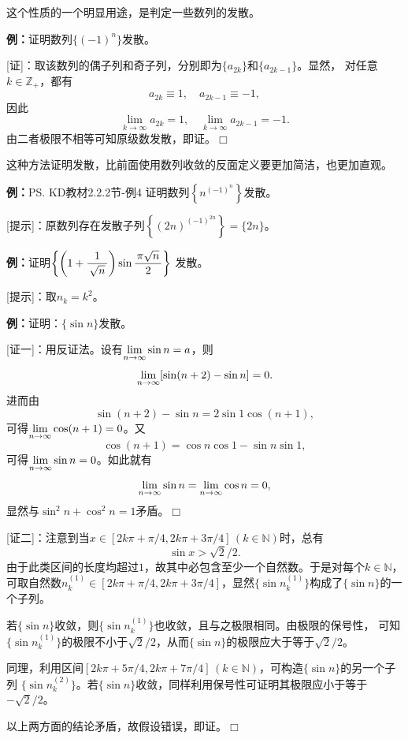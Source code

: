 
这个性质的一个明显用途，是判定一些数列的发散。

{\bf 例：}证明数列$\{(-1)^n\}$发散。

[证]：取该数列的偶子列和奇子列，分别即为$\{a_{2k}\}$和$\{a_{2k-1}\}$。显然，
对任意$k\in\mathbb{Z}_+$，都有
$$a_{2k}\equiv 1,\quad a_{2k-1}\equiv -1,$$
因此
$$\lim\limits_{k\to\infty}a_{2k}=1,\quad
\lim\limits_{k\to\infty}a_{2k-1}=-1.$$
由二者极限不相等可知原级数发散，即证。\hfill $\Box$

这种方法证明发散，比前面使用数列收敛的反面定义要更加简洁，也更加直观。

{\bf 例：}\ps{KD教材2.2.2节-例4}
证明数列$\left\{n^{(-1)^n}\right\}$发散。

[提示]：原数列存在发散子列$\left\{(2n)^{(-1)^{2n}}\right\}=\{2n\}$。

{\bf 例：}证明$\left\{\left(1+\displaystyle\frac{\,{1}\,}{\,{\sqrt n}\,}\right)\sin\displaystyle\frac{\,{\pi\sqrt n}\,}{\,{2}\,}\right\}$
发散。

[提示]：取$n_k=k^2$。 

\begin{shaded}
	{\bf 例：}证明：$\{\sin n\}$发散。
	
	[证一]：用反证法。设有$\lim\limits_{n\to\infty}\sin n=a$，则
	$$\lim\limits_{n\to\infty}[\sin(n+2)-\sin n]=0.$$
	进而由
	$$\sin(n+2)-\sin n=2\sin 1\cos(n+1),$$
	可得$\lim\limits_{n\to\infty}\cos(n+1)=0$。又
	$$\cos(n+1)=\cos n\cos 1-\sin n\sin 1,$$
	可得$\lim\limits_{n\to\infty}\sin n=0$。如此就有
	$$\lim\limits_{n\to\infty}\sin n=\lim\limits_{n\to\infty}\cos n=0,$$
	显然与$\sin^2n+\cos^2n=1$矛盾。\hfill $\Box$
	
	[证二]：注意到当$x\in[2k\pi+\pi/4,2k\pi+3\pi/4]\,(k\in\mathbb{N})$时，总有
	$$\sin x>\sqrt2/2.$$
	由于此类区间的长度均超过$1$，故其中必包含至少一个自然数。于是对每个$k\in\mathbb{N}$，
	可取自然数$n^{(1)}_k\in[2k\pi+\pi/4,2k\pi+3\pi/4]$，显然$\{\sin{n^{(1)}_k}\}$构成了$\{\sin
	n\}$的一个子列。
	
	若$\{\sin n\}$收敛，则$\{\sin{n^{(1)}_k}\}$也收敛，且与之极限相同。由极限的保号性，
	可知$\{\sin{n^{(1)}_k}\}$的极限不小于$\sqrt2/2$，从而$\{\sin
	n\}$的极限应大于等于$\sqrt2/2$。
	
	同理，利用区间$[2k\pi+5\pi/4,2k\pi+7\pi/4]\,(k\in\mathbb{N})$，可构造$\{\sin
	n\}$的另一个子列 $\{\sin{n^{(2)}_k}\}$。若$\{\sin n\}$收敛，同样利用保号性可证明其极限应小于等于$-\sqrt2/2$。
	
	以上两方面的结论矛盾，故假设错误，即证。\hfill $\Box$
\end{shaded}

